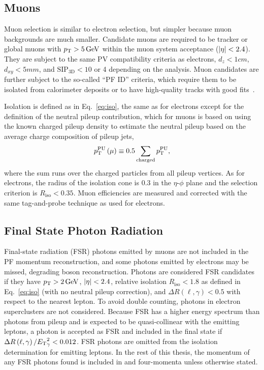 \subsection{Muons}

Muon selection is similar to electron selection, but simpler because muon backgrounds are much smaller.
Candidate muons are required to be tracker or global muons with $p_\mathrm{T} > 5\,\mathrm{Ge\hspace{-.08em}V}$  within the muon system acceptance ($\lvert \eta \rvert < 2.4$).
They are subject to the same PV compatibility criteria as electrons, $d_z < 1\unit{cm}$, $d_{xy} < 5\unit{mm}$, and $\text{SIP}_\text{3D} < 10$ or 4 depending on the analysis.
Muon candidates are further subject to the so-called ``PF ID'' criteria, which require them to be isolated from calorimeter deposits or to have high-quality tracks with good fits~\cite{Sirunyan:2017ulk}.

Isolation is defined as in Eq.~\ref{eq:iso}, the same as for electrons except for the definition of the neutral pileup contribution, which for muons is based on using the known charged pileup density to estimate the neutral pileup based on the average charge composition of pileup jets,
\begin{equation}
  p_\mathrm{T}^\text{PU}\left(\mathrm{\mu}\right) \equiv 0.5 \sum_\text{charged} p_\mathrm{T}^\text{PU},
\end{equation}
where the sum runs over the charged particles from all pileup vertices.
As for electrons, the radius of the isolation cone is 0.3 in the $\eta$-$\phi$ plane and the selection criterion is $R_\text{iso} < 0.35$.
Muon efficiencies are measured and corrected with the same tag-and-probe technique as used for electrons.


\subsection{Final State Photon Radiation}

Final-state radiation (FSR) photons emitted by muons are not included in the PF momentum reconstruction, and some photons emitted by electrons may be missed, degrading {\PZ} boson reconstruction.
Photons are considered FSR candidates if they have $p_\mathrm{T} > 2\,\mathrm{Ge\hspace{-.08em}V}$, $\lvert \eta \rvert < 2.4$, relative isolation $R_\text{iso} < 1.8$ as defined in Eq.~\ref{eq:iso} (with no neutral pileup correction), and $\Delta R \left(\ell, \gamma \right) < 0.5$ with respect to the nearest lepton.
To avoid double counting, photons in electron superclusters are not considered.
Because FSR has a higher energy spectrum than photons from pileup and is expected to be quasi-collinear with the emitting leptons, a photon is accepted as FSR and included in the {\ZZ} final state if $\Delta R \left( \ell, \gamma \right) / {E_\mathrm{T}}_\gamma^2 < 0.012$.
FSR photons are omitted from the isolation determination for emitting leptons.
In the rest of this thesis, the momentum of any FSR photons found is included in {\Zgs} and {\ZZ} four-momenta unless otherwise stated.


